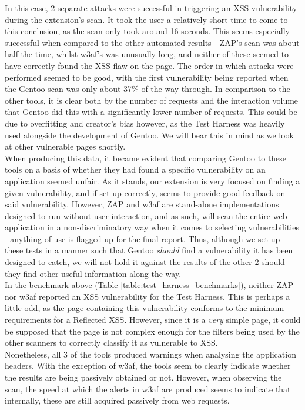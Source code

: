 In this case, 2 separate attacks were successful in triggering an XSS vulnerability during the extension's scan. It took the user a relatively short time to come to this conclusion, as the scan only took around 16 seconds. This seems especially successful when compared to the other automated results - ZAP's scan was about half the time, whilst w3af's was unusually long, and neither of these seemed to have correctly found the XSS flaw on the page. The order in which attacks were performed seemed to be good, with the first vulnerability being reported when the Gentoo scan was only about 37\% of the way through. In comparison to the other tools, it is clear both by the number of requests and the interaction volume that Gentoo did this with a significantly lower number of requests. This could be due to overfitting and creator's bias however, as the Test Harness was heavily used alongside the development of Gentoo. We will bear this in mind as we look at other vulnerable pages shortly.  \\

When producing this data, it became evident that comparing Gentoo to these tools on a basis of whether they had found a specific vulnerability on an application seemed unfair. As it stands, our extension is very focused on finding a given vulnerability, and if set up correctly, seems to provide good feedback on said vulnerability. However, ZAP and w3af are stand-alone implementations designed to run without user interaction, and as such, will scan the entire web-application in a non-discriminatory way when it comes to selecting vulnerabilities - anything of use is flagged up for the final report. Thus, although we set up these tests in a manner such that Gentoo \textit{should} find a vulnerability it has been designed to catch, we will not hold it against the results of the other 2 should they find other useful information along the way. \\

In the benchmark above (Table \ref{table:test_harness_benchmarks}), neither ZAP nor w3af reported an XSS vulnerability for the Test Harness. This is perhaps a little odd, as the page containing this vulnerability conforms to the minimum requirements for a Reflected XSS. However, since it is a \textit{very} simple page, it could be supposed that the page is not complex enough for the filters being used by the other scanners to correctly classify it as vulnerable to XSS. \\

Nonetheless, all 3 of the tools produced warnings when analysing the application headers. With the exception of w3af, the tools seem to clearly indicate whether the results are being passively obtained or not. However, when observing the scan, the speed at which the alerts in w3af are produced seems to indicate that internally, these are still acquired passively from web requests. \\

